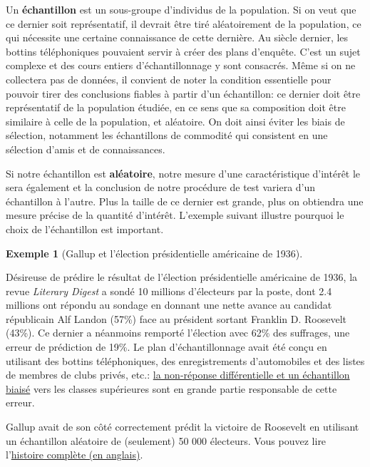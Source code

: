 \documentclass[
  11pt,
  letterpaper,
]{scrbook}
\theoremstyle{plain}
\theoremstyle{plain}
\theoremstyle{definition}
\newtheorem{example}{Exemple}[chapter]
\theoremstyle{definition}
\theoremstyle{remark}
\begin{document}
Un \textbf{échantillon} est un sous-groupe d'individus de la population.
Si on veut que ce dernier soit représentatif, il devrait être tiré
aléatoirement de la population, ce qui nécessite une certaine
connaissance de cette dernière. Au siècle dernier, les bottins
téléphoniques pouvaient servir à créer des plans d'enquête. C'est un
sujet complexe et des cours entiers d'échantillonnage y sont consacrés.
Même si on ne collectera pas de données, il convient de noter la
condition essentielle pour pouvoir tirer des conclusions fiables à
partir d'un échantillon: ce dernier doit être représentatif de la
population étudiée, en ce sens que sa composition doit être similaire à
celle de la population, et aléatoire. On doit ainsi éviter les biais de
sélection, notamment les échantillons de commodité qui consistent en une
sélection d'amis et de connaissances.

Si notre échantillon est \textbf{aléatoire}, notre mesure d'une
caractéristique d'intérêt le sera également et la conclusion de notre
procédure de test variera d'un échantillon à l'autre. Plus la taille de
ce dernier est grande, plus on obtiendra une mesure précise de la
quantité d'intérêt. L'exemple suivant illustre pourquoi le choix de
l'échantillon est important.

\begin{example}[Gallup et l'élection présidentielle américaine de
1936]\protect\hypertarget{exm-Gallup}{}\label{exm-Gallup}

Désireuse de prédire le résultat de l'élection présidentielle américaine
de 1936, la revue \emph{Literary Digest} a sondé 10 millions d'électeurs
par la poste, dont 2.4 millions ont répondu au sondage en donnant une
nette avance au candidat républicain Alf Landon (57\%) face au président
sortant Franklin D. Roosevelt (43\%). Ce dernier a néanmoins remporté
l'élection avec 62\% des suffrages, une erreur de prédiction de 19\%. Le
plan d'échantillonnage avait été conçu en utilisant des bottins
téléphoniques, des enregistrements d'automobiles et des listes de
membres de clubs privés, etc.:
\href{https://www.jstor.org/stable/2749114}{la non-réponse
différentielle et un échantillon biaisé} vers les classes supérieures
sont en grande partie responsable de cette erreur.

Gallup avait de son côté correctement prédit la victoire de Roosevelt en
utilisant un échantillon aléatoire de (seulement) 50 000 électeurs. Vous
pouvez lire
l'\href{https://ozanozbey.medium.com/two-lessons-of-sampling-bias-from-1936-us-election-e4e96bd42be}{histoire
complète (en anglais)}.

\end{example}
\end{document}
